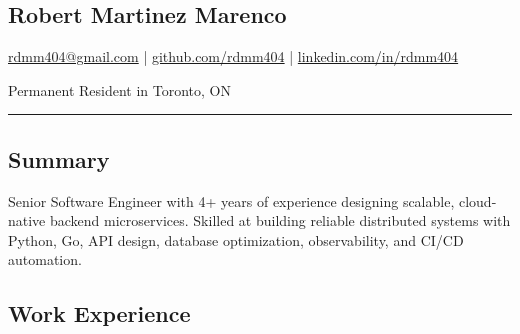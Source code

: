 \documentclass[a4paper,10pt]{article}
\begin{document}
\pagestyle{empty}

\begin{center}
  \section*{\LARGE Robert Martinez Marenco}
  \href{mailto:rdmm404@gmail.com}{rdmm404@gmail.com} |
  \href{https://github.com/rdmm404}{github.com/rdmm404} |
  \href{https://linkedin.com/in/rdmm404}{linkedin.com/in/rdmm404}

  Permanent Resident in Toronto, ON
\end{center}

\hrule
\vspace{4pt}

\subsection*{Summary}
Senior Software Engineer with 4+ years of experience designing scalable, cloud-native backend microservices.
Skilled at building reliable distributed systems with Python, Go, API design, database optimization,
observability, and CI/CD automation.
\subsection*{Work Experience}
\end{document}

